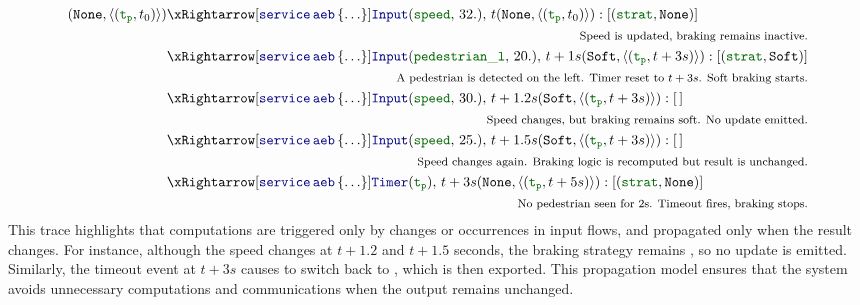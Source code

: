 \begin{align*}
  (\No, \queue{(\idf{t_p},t_0)}) & \xRightarrow[\service{\kwf{aeb}}{\dots}]{\inputMess{\idf{speed}}{32.}, \, t} (\No, \queue{(\idf{t_p},t_0)}): [(\idf{strat}, \No)]                \\
                                 & \pushright{\text{\footnotesize Speed is updated, braking remains inactive.}}                                                                     \\
                                 & \xRightarrow[\service{\kwf{aeb}}{\dots}]{\inputMess{\idf{pedestrian\_l}}{20.}, \,t+1s} (\Soft, \queue{(\idf{t_p},t+3s)}): [(\idf{strat}, \Soft)] \\
                                 & \pushright{\text{\footnotesize A pedestrian is detected on the left. Timer reset to $t+3s$. Soft braking starts.}}                               \\
                                 & \xRightarrow[\service{\kwf{aeb}}{\dots}]{\inputMess{\idf{speed}}{30.}, \, t+1.2s} (\Soft, \queue{(\idf{t_p},t+3s)}): \emptylist                  \\
                                 & \pushright{\text{\footnotesize Speed changes, but braking remains soft. No update emitted.}}                                                     \\
                                 & \xRightarrow[\service{\kwf{aeb}}{\dots}]{\inputMess{\idf{speed}}{25.}, \, t+1.5s} (\Soft, \queue{(\idf{t_p},t+3s)}): \emptylist                  \\
                                 & \pushright{\text{\footnotesize Speed changes again. Braking logic is recomputed but result is unchanged.}}                                       \\
                                 & \xRightarrow[\service{\kwf{aeb}}{\dots}]{\timerMess{\idf{t_p}}, \, t+3s} (\No, \queue{(\idf{t_p},t+5s)}): [(\idf{strat}, \No)]                   \\
                                 & \pushright{\text{\footnotesize No pedestrian seen for 2s. Timeout fires, braking stops.}}
\end{align*}
This trace highlights that computations are triggered only by changes or occurrences in input flows,
and propagated only when the result changes. For instance, although the speed changes at $t + 1.2$
and $t + 1.5$ seconds, the braking strategy remains \Soft, so no update is emitted. Similarly,
the timeout event at $t + 3s$ causes  to switch back to \No, which is then exported.
This propagation model ensures that the system avoids unnecessary computations and communications
when the output remains unchanged.

